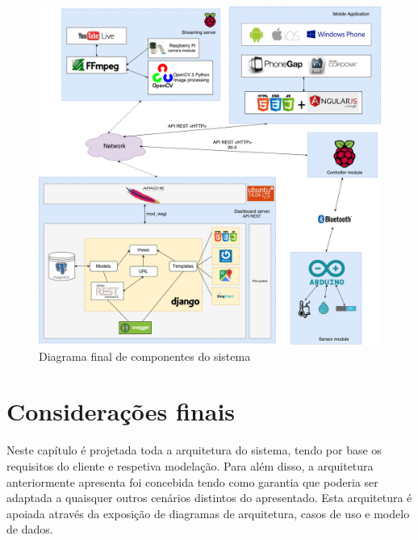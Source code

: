 \newpage

\begin{figure}[!htb]
	\centering
	\includegraphics[width=\linewidth]{esquemas/arquitetura-final.pdf}
	\caption{Diagrama final de componentes do sistema}
	\label{componentesall}
\end{figure}







\section{Considerações finais}


Neste capítulo é projetada toda a arquitetura do sistema, tendo por base os requisitos do cliente e respetiva modelação. Para além disso, a arquitetura anteriormente apresenta foi concebida tendo como garantia que poderia ser adaptada a quaisquer outros cenários distintos do apresentado. Esta arquitetura é apoiada através da exposição de diagramas de arquitetura, casos de uso e modelo de dados. 







